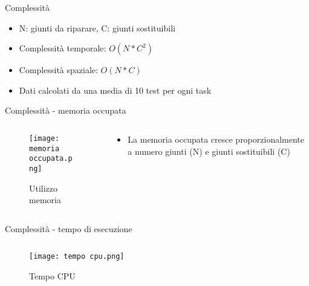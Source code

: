 \documentclass{beamer}
\begin{document}
\begin{frame}{Complessità}
    \begin{itemize}
        \item N: giunti da riparare, C: giunti sostituibili
        \item Complessità temporale: \begin{math}O(N * C^2)\end{math}
        \item Complessità spaziale: \begin{math}O(N * C)\end{math}
        \item Dati calcolati da una media di 10 test per ogni task
    \end{itemize}    
\end{frame}

\begin{frame}{Complessità - memoria occupata}
    \begin{columns}
    \begin{column}{0.5\textwidth}
    \begin{figure}
        \texttt{[image: memoria occupata.png]}
        \caption{Utilizzo memoria}
    \end{figure}
    \end{column}
     \begin{column}{0.5\textwidth}
            \begin{itemize}
                \item La memoria occupata cresce proporzionalmente a numero giunti (N) e giunti sostituibili (C)
            \end{itemize}
        \end{column}
    \end{columns}
    
\end{frame}

\begin{frame}{Complessità - tempo di esecuzione}
\begin{columns}
    \begin{column}{0.5\textwidth}
     \begin{figure}
        \texttt{[image: tempo cpu.png]}
        \caption{Tempo CPU}
    \end{figure}
    \end{column}
     \begin{column}{0.5\textwidth}
            \begin{itemize}
                
            \end{itemize}
        \end{column}
    \end{columns}
\end{frame}
\end{document}
